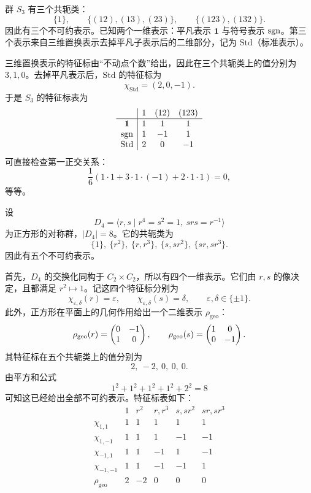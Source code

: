 \begin{example}[$S_3$ 的特征标表]
群 $S_3$ 有三个共轭类：
\[
\{1\},\qquad \{(12),(13),(23)\},\qquad \{(123),(132)\}.
\]
因此有三个不可约表示。已知两个一维表示：平凡表示 $\mathbf{1}$ 与符号表示 $\operatorname{sgn}$。第三个表示来自三维置换表示去掉平凡子表示后的二维部分，记为 $\mathrm{Std}$（标准表示）。

三维置换表示的特征标由“不动点个数”给出，因此在三个共轭类上的值分别为 $3,1,0$。去掉平凡表示后，$\mathrm{Std}$ 的特征标为
\[
\chi_{\mathrm{Std}}=(2,0,-1).
\]
于是 $S_3$ 的特征标表为
\[
\begin{array}{c|ccc}
 & 1 & (12) & (123)\\
\hline
\mathbf{1} & 1 & 1 & 1\\
\operatorname{sgn} & 1 & -1 & 1\\
\mathrm{Std} & 2 & 0 & -1
\end{array}
\]
可直接检查第一正交关系：
\[
\frac{1}{6}(1\cdot 1+3\cdot 1\cdot (-1)+2\cdot 1\cdot 1)=0,
\]
等等。
\end{example}

\begin{example}[$D_4$ 的特征标表]
设
\[
D_4=\langle r,s\mid r^4=s^2=1,\ srs=r^{-1}\rangle
\]
为正方形的对称群，$|D_4|=8$。它的共轭类为
\[
\{1\},\ \{r^2\},\ \{r,r^3\},\ \{s,sr^2\},\ \{sr,sr^3\}.
\]
因此有五个不可约表示。

首先，$D_4$ 的交换化同构于 $C_2\times C_2$，所以有四个一维表示。它们由 $r,s$ 的像决定，且都满足 $r^2\mapsto 1$。记这四个特征标分别为
\[
\chi_{\varepsilon,\delta}(r)=\varepsilon,\qquad \chi_{\varepsilon,\delta}(s)=\delta,
\qquad \varepsilon,\delta\in\{\pm 1\}.
\]
此外，正方形在平面上的几何作用给出一个二维表示 $\rho_{\mathrm{geo}}$：
\[
\rho_{\mathrm{geo}}(r)=\begin{pmatrix} 0&-1\\1&0 \end{pmatrix},
\qquad
\rho_{\mathrm{geo}}(s)=\begin{pmatrix} 1&0\\0&-1 \end{pmatrix}.
\]
其特征标在五个共轭类上的值分别为
\[
2,\ -2,\ 0,\ 0,\ 0.
\]
由平方和公式
\[
1^2+1^2+1^2+1^2+2^2=8
\]
可知这已经给出全部不可约表示。特征标表如下：
\[
\begin{array}{c|ccccc}
 & 1 & r^2 & r,r^3 & s,sr^2 & sr,sr^3\\
\hline
\chi_{1,1} & 1 & 1 & 1 & 1 & 1\\
\chi_{1,-1} & 1 & 1 & 1 & -1 & -1\\
\chi_{-1,1} & 1 & 1 & -1 & 1 & -1\\
\chi_{-1,-1} & 1 & 1 & -1 & -1 & 1\\
\rho_{\mathrm{geo}} & 2 & -2 & 0 & 0 & 0
\end{array}
\]
\end{example}

